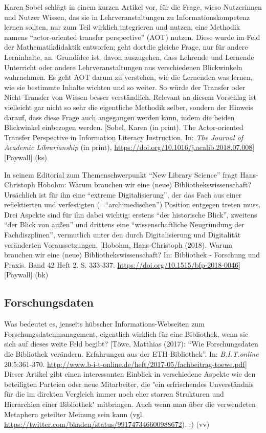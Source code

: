 \documentclass[a4paper,
fontsize=11pt,
oneside,
numbers=noperiodatend,
parskip=half-,
bibliography=totoc,
final
]{scrartcl}
\begin{document}
Karen Sobel schlägt in einem kurzen Artikel vor, für die Frage, wieso
Nutzerinnen und Nutzer Wissen, das sie in Lehrveranstaltungen zu
Informationskompetenz lernen sollten, nur zum Teil wirklich integrieren
und nutzen, eine Methodik namens \enquote{actor-oriented transfer
perspective} (AOT) nutzen. Diese wurde im Feld der Mathematikdidaktik
entworfen; geht dortdie gleiche Frage, nur für andere Lerninhalte, an.
Grundidee ist, davon auszugehen, dass Lehrende und Lernende Unterricht
oder andere Lehrveranstaltungen aus verschiedenen Blickwinkeln
wahrnehmen. Es geht AOT darum zu verstehen, wie die Lernenden was
lernen, wie sie bestimmte Inhalte wichten und so weiter. So würde der
Transfer oder Nicht-Transfer von Wissen besser verständlich. Relevant an
diesem Vorschlag ist vielleicht gar nicht so sehr die eigentliche
Methodik selber, sondern der Hinweis darauf, dass diese Frage auch
angegangen werden kann, indem die beiden Blickwinkel einbezogen werden.
{[}Sobel, Karen (in print). The Actor-oriented Transfer Perspective in
Information Literacy Instruction. In: \emph{The Journal of Academic
Librarianship} (in print),
\url{https://doi.org/10.1016/j.acalib.2018.07.008}{]} {[}Paywall{]} (ks)

In seinem Editorial zum Themenschwerpunkt \enquote{New Library Science}
fragt Hans-Christoph Hobohm: Warum brauchen wir eine (neue)
Bibliothekswissenschaft? Ursächlich ist für ihn eine \enquote{extreme
Digitalisierung}, der das Fach aus einer reflektierten und verfestigten
(=\enquote{archimedischen}) Position entgegen treten muss. Drei Aspekte
sind für ihn dabei wichtig: erstens \enquote{der historische Blick},
zweitens \enquote{der Blick von außen} und drittens eine
\enquote{wissenschaftliche Neugründung der Fachdiszplinen}, vermutlich
unter den durch Digitalisierung und Digitalität veränderten
Voraussetzungen. {[}Hobohm, Hans-Christoph (2018). Warum brauchen wir
eine (neue) Bibliothekswissenschaft? In: Bibliothek - Forschung und
Praxis. Band 42 Heft 2. S. 333-337.
\url{https://doi.org/10.1515/bfp-2018-0046}{]} {[}Paywall{]} (bk)

\hypertarget{forschungsdaten}{%
\subsection{Forschungsdaten}\label{forschungsdaten}}

Was bedeutet es, jenseits hübscher Informations-Webseiten zum
Forschungsdatenmanagement, eigentlich wirklich für eine Bibliothek, wenn
sie sich auf dieses weite Feld begibt? {[}Töwe, Matthias (2017):
\enquote{Wie Forschungsdaten die Bibliothek verändern. Erfahrungen aus
der ETH-Bibliothek}. In: \emph{B.I.T.online} 20.5:361-370.
\url{http://www.b-i-t-online.de/heft/2017-05/fachbeitrag-toewe.pdf}{]}
Dieser Artikel gibt einen interessanten Einblick in verschiedene Aspekte
wie den beteiligten Parteien oder neue Mitarbeiter, die "ein
erfrischendes Unverständnis für die im direkten Vergleich immer noch
eher starren Strukturen und Hierarchien einer Bibliothek" mitbringen.
Auch wenn man über die verwendeten Metaphern geteilter Meinung sein kann
(vgl. \url{https://twitter.com/bkaden/status/991747346600988672}). :)
(vv)
\end{document}
